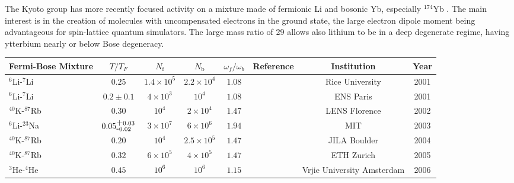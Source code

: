 \documentclass[pra,letterpaper,twocolumn,showpacs,superscriptaddress]{revtex4}
\begin{document}
The Kyoto group has more recently focused activity on a mixture made of fermionic Li and bosonic 
Yb, especially ${}^{174}$Yb \cite{Hara2011}. The main interest is in the creation of molecules 
with uncompensated electrons in the ground state, the large electron dipole moment 
being advantageous for spin-lattice quantum simulators. The large mass ratio of 29 allows also 
lithium to be in a deep degenerate regime, having ytterbium nearly or below Bose degeneracy.
\begin{table*}[t]
\begin{center}
\begin{tabular}{|l|c|c|c|c|c|c|c|}
\hline
Fermi-Bose Mixture                                & $T/T_F$            & $N_\mathrm{f}$                      &  $N_\mathrm{b}$                     & $\omega_f/\omega_b$ & Reference & Institution & Year\\
\hline 
 ${}^6$Li-${}^7$Li                & $0.25$                              &            $1.4 \times 10^5$          & $2.2 \times 10^4$    &  $1.08$           & \cite{Truscott2001}  &Rice University   & 2001   \\
 ${}^6$Li-${}^7$Li                & $0.2\pm 0.1$                   &             $4 \times 10^3$              & $10^4$                   &  $1.08$            & \cite{Schreck2001b} & ENS Paris & 2001   \\
 ${}^{40}$K-${}^{87}$Rb       &  $0.30$                             &   $10^4$                                       & $2 \times 10^4$   &    $1.47$           &  \cite{Roati2002}      & LENS Florence & 2002  \\
 ${}^6$Li-${}^{23}$Na          &  $0.05{}^{\mbox +0.03}_{\mbox -0.02}$  &  $3 \times 10^7$  & $6 \times 10^6$   &   $1.94$            &  \cite{Hadzibabic2003}  & MIT & 2003   \\
${}^{40}$K-${}^{87}$Rb       &  $0.20$                             &   $10^4$                                       & $2.5 \times 10^5$   &    $1.47$           &  \cite{Goldwin2004}      & JILA Boulder & 2004  \\
 ${}^{40}$K-${}^{87}$Rb       &  $0.32$                             &  $6 \times 10^5$                         & $4 \times 10^5$    &   $1.47$                 &  \cite{Kohl2005}  & ETH Zurich & 2005   \\
 ${}^{3}$He-${}^{4}$He        &  $0.45$                              &   $10^6$                          &  $10^6$                 &    $1.15$           &  \cite{McNamara2006}   & Vrjie University Amsterdam & 2006 \\

\end{tabular}
\end{center}
\end{table*}
\end{document}
